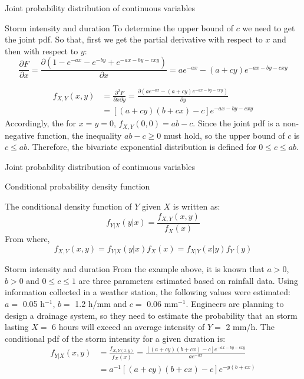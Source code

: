 \documentclass[8pt]{beamer}
\renewcommand{\emph}[1]{\textcolor{myorange}{#1}}
\begin{document}
\begin{frame}{Joint probability distribution of continuous variables}
    \begin{exampleblock}{Storm intensity and duration}
To determine the upper bound of $c$ we need to get the joint \emph{pdf}. So that, first we get the partial derivative with respect to $x$ and then with respect to $y$: 
\[
    \frac{\partial F}{\partial x} = \frac{\partial \left(1-e^{-ax}-e^{-by}+e^{-ax-by-cxy} \right)}{\partial x} = a e^{-ax} - (a + cy)e^{-ax-by-cxy}
\]

        \begin{align*}
            f_{X,Y}(x,y) &= \frac{\partial^2 F}{\partial x \partial y} = \frac{\partial \left( a e^{-ax} - (a + cy)e^{-ax-by-cxy}\right)}{\partial y} \\
                         &= \left[ (a+cy)(b+cx)-c \right]e^{-ax-by-cxy}
        \end{align*}
        Accordingly, the for $x=y=0$, $f_{X,Y}(0,0)= ab-c$. Since the joint \emph{pdf} is a non-negative function, the inequality $ab-c \geq 0$ must hold, so the upper bound of $c$ is $c\leq ab$. Therefore, the bivariate exponential distribution is defined for $0 \leq c \leq ab$. 
    \end{exampleblock}
\end{frame}

\begin{frame}{Joint probability distribution of continuous variables}
    \begin{block}{Conditional probability density function}

        The \alert{conditional density function} of $Y$ given $X$ is written as:
        \[
        f_{Y | X} (y|x) = \frac{f_{X,Y} (x,y)}{f_X (x)}
    \]
    From where,
        \[
         f_{X,Y} (x,y)=f_{Y | X} (y|x) f_X (x) = f_{X | Y} (x|y) f_Y (y)
    \]

    \end{block}
    \begin{exampleblock}{Storm intensity and duration}
        From the example above, it is known that $a>0$, $b>0$ and $0\leq c \leq 1$ are three parameters estimated based on rainfall data. Using information collected in a weather station, the following values were estimated: $a =$ 0.05 h$^{-1}$, $b =$ 1.2 h/mm and $c = $ 0.06 mm$^{-1}$. Engineers are planning to design a drainage system, so they need to estimate the probability that an storm lasting $X =$ 6 hours will exceed an average intensity of $Y = $ 2 mm/h.
        The conditional \emph{pdf} of the storm intensity for a given duration is:
        \begin{align*}
            f_{Y|X} (x,y) &= \frac{f_{X,Y (x,y)}}{f_X(x)} = \frac{\left[ (a+cy)(b+cx)-c \right]e^{-ax-by-cxy}}{a e^{-ax}} \\
                          &= a^{-1}\left[ (a+cy)(b+cx)-c \right]e^{-y(b+cx)}
        \end{align*}

    \end{exampleblock}
\end{frame}
\end{document}
